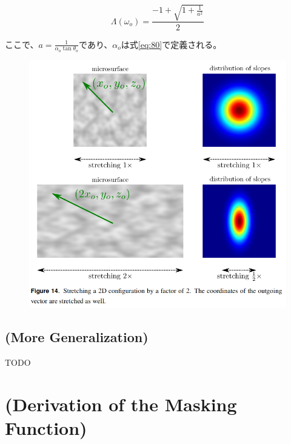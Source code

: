 \documentclass[a4j,xelatex,ja=standard]{bxjsarticle}
\begin{document}
\begin{equation}
    \Lambda(\omega_o) = \frac{-1 + \sqrt{1 + \frac{1}{a^2}}}{2}
    \label{eq:86}
\end{equation}

ここで、$a = \frac{1}{\alpha_o \tan\theta_o}$であり、$\alpha_o$は式\eqref{eq:80}で定義される。

\begin{figure}
    \includegraphics[width=\textwidth]{Figure14.png}
    \caption{}
    \label{fig:14}
\end{figure}

\subsection{(More Generalization)}

TODO

\printbibliography[title=参考文献]

\appendix

\section{(Derivation of the Masking Function)}
\label{sec:A}
\end{document}
